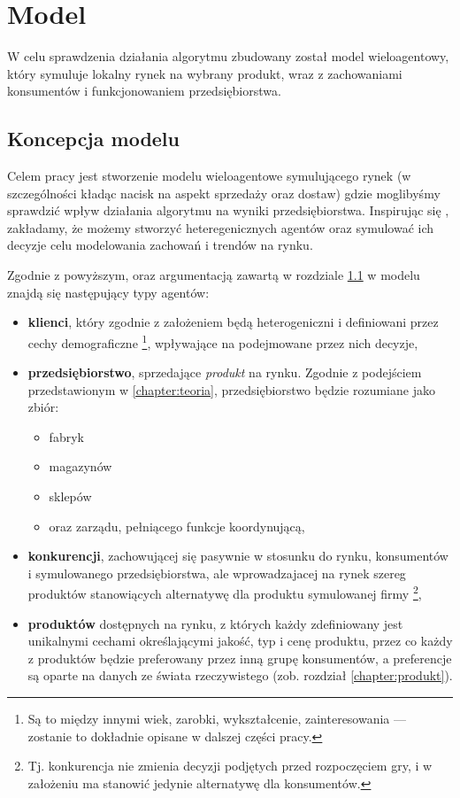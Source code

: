\documentclass[polish, twoside, 12pt, a4paper]{article}
\theoremstyle{definition}
\theoremstyle{plain}
\theoremstyle{remark}
\begin{document}
\clearpage

\section{Model} \label{chapter:model}

W celu sprawdzenia działania algorytmu zbudowany został model wieloagentowy, który symuluje lokalny rynek na wybrany produkt, wraz z zachowaniami konsumentów i funkcjonowaniem przedsiębiorstwa.

\subsection{Koncepcja modelu} \label{chapter:koncepcja}

Celem pracy jest stworzenie modelu wieloagentowe symulującego rynek (w szczególności kładąc nacisk na aspekt sprzedaży oraz dostaw) gdzie moglibyśmy sprawdzić wpływ działania algorytmu na wyniki przedsiębiorstwa. Inspirując się \cite{Kaminski2012}, zakładamy, że możemy stworzyć heteregenicznych agentów oraz symulować ich decyzje celu modelowania zachowań i trendów na rynku. 

Zgodnie z powyższym, oraz argumentacją zawartą w rozdziale \ref{chapter:koncepcja} w modelu znajdą się następujący typy agentów: 

\begin{itemize} 
	\item \textbf{klienci}, który zgodnie z założeniem będą heterogeniczni i definiowani przez cechy demograficzne \footnote{Są to między innymi wiek, zarobki, wykształcenie, zainteresowania --- zostanie to dokładnie opisane w dalszej części pracy.}, wpływające na podejmowane przez nich decyzje,
	\item \textbf{przedsiębiorstwo}, sprzedające \textit{produkt} na rynku. Zgodnie z podejściem przedstawionym w \ref{chapter:teoria}, przedsiębiorstwo będzie rozumiane jako zbiór:
		\begin{itemize}
			\item fabryk
			\item magazynów
			\item sklepów 
			\item oraz zarządu, pełniącego funkcje koordynującą,
		\end{itemize}
	\item \textbf{konkurencji}, zachowującej się pasywnie w stosunku do rynku, konsumentów i symulowanego przedsiębiorstwa, ale wprowadzajacej na rynek szereg produktów stanowiących alternatywę dla produktu symulowanej firmy \footnote{Tj. konkurencja nie zmienia decyzji podjętych przed rozpoczęciem gry, i w założeniu ma stanowić jedynie alternatywę dla konsumentów.},
	\item \textbf{produktów} dostępnych na rynku, z których każdy zdefiniowany jest unikalnymi cechami określającymi jakość, typ i cenę produktu, przez co każdy z produktów będzie preferowany przez inną grupę konsumentów, a preferencje są oparte na danych ze świata rzeczywistego (zob. rozdział \ref{chapter:produkt}). 
\end{itemize}
\end{document}
